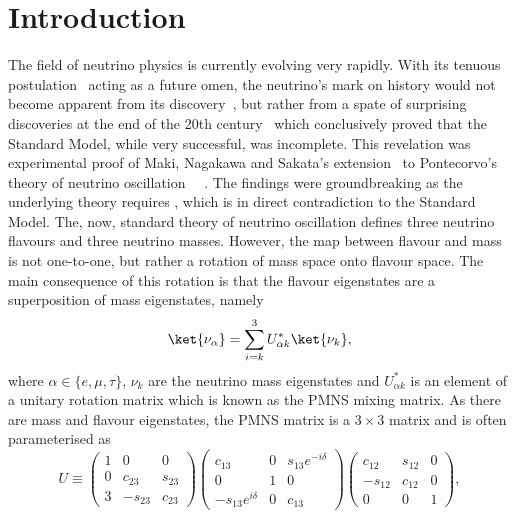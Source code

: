 \chapter{Introduction}
\label{chap:Introduction}


The field of neutrino physics is currently evolving very rapidly.  With its tenuous postulation~\cite{PauliOpenLetter} acting as a future omen, the neutrino's mark on history would not become apparent from its discovery~\cite{Cowan20071956, PhysRevLett.9.36, Kodama2001218}, but rather from a spate of surprising discoveries at the end of the 20th century~\cite{PhysRevLett.81.1562, PhysRevLett.87.071301, PhysRevLett.90.021802} which conclusively proved that the Standard Model, while very successful, was incomplete.  This revelation was experimental proof of Maki, Nagakawa and Sakata's extension~\cite{Maki01111962} to Pontecorvo's theory of neutrino oscillation~\cite{Pontecorvo} ~\cite{PhysRevD.17.2369,Mikheev:1986gs}.  The findings were groundbreaking as the underlying theory requires , which is in direct contradiction to the Standard Model.  The, now, standard theory of neutrino oscillation defines three neutrino flavours and three neutrino masses.  However, the map between flavour and mass is not one-to-one, but rather a rotation of mass space onto flavour space.  The main consequence of this rotation is that the flavour eigenstates are a superposition of mass eigenstates, namely
\begin{equation}
\ket{\nu_\alpha} = \sum^{3}_{i=k}U^{\ast}_{\alpha k}\ket{\nu_k},
\label{eq:NeutrinoEigenstates}
\end{equation}
where $\alpha \in \{e,\mu, \tau\}$, $\nu_k$ are the neutrino mass eigenstates and $U^{\ast}_{\alpha k}$ is an element of a unitary rotation matrix which is known as the PMNS mixing matrix.  As there are  mass and flavour eigenstates, the PMNS matrix is a $3\times3$ matrix and is often parameterised as 
\begin{equation}
U \equiv
\begin{pmatrix}
1 & 0 & 0 \\
0 & c_{23} & s_{23} \\
3 & -s_{23} & c_{23}
\end{pmatrix}
\begin{pmatrix}
c_{13} & 0 & s_{13}e^{-i\delta} \\
0 & 1 & 0 \\
-s_{13}e^{i\delta} & 0 & c_{13} 
\end{pmatrix}
\begin{pmatrix}
c_{12} & s_{12} & 0 \\
-s_{12} & c_{12} & 0 \\
0 & 0 & 1
\end{pmatrix}
,
\label{eq:PMNSMatrix}
\end{equation}
